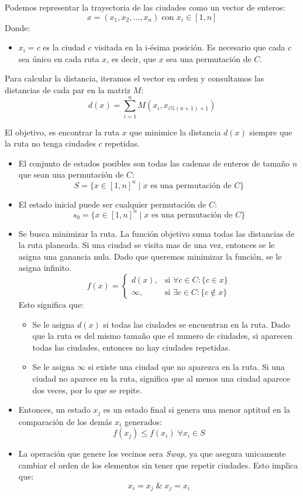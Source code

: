 Podemos representar la trayectoria de las ciudades como un vector de enteros:
\[ x = (x_1, x_2, \dots, x_n) \; \text{con } x_i \in [1, n] \]
Donde:
\begin{itemize}
	\item $x_i = c$ es la ciudad $c$ visitada en la i-ésima posición. Es necesario que cada $c$ sea único en cada ruta $x$, es decir, que $x$ sea una permutación de $C$.
\end{itemize}

Para calcular la distancia, iteramos el vector en orden y consultamos las distancias de cada par en la matriz $M$: 
\[ d(x) = \sum_{i = 1}^{n} M(x_i, x_{i \%(n+1)+ 1}) \]

El objetivo, es encontrar la ruta $x$ que minimice la distancia $d(x)$ siempre que la ruta no tenga ciudades $c$ repetidas.

\begin{itemize}
	\item El conjunto de estados posibles son todas las cadenas de enteros de tamaño $n$ que sean una permutación de $C$: \[ S = \{ x \in [1, n]^n \;|\; x \text{ es una permutación de } C \} \]
	
	\item El estado inicial puede ser cualquier permutación de $C$: 
	\[ s_0 = \{ x \in [1, n]^n \;|\; x \text{ es una permutación de } C \} \]
	
	\item Se busca minimizar la ruta. La función objetivo suma todas las distancias de la ruta planeada. Si una ciudad se visita mas de una vez, entonces se le asigna una ganancia nula. Dado que queremos minimizar la función, se le asigna infinito.
	\[
	f(x) =
	\begin{cases} 
		d(x), & \text{si } \forall c \in C \colon \{ c \in x \} \\ 
		\infty, & \text{si } \exists c \in C \colon \{c \notin x\}
	\end{cases}
	\]
	Esto significa que:
	\begin{itemize}
		\item Se le asigna $d(x)$ si todas las ciudades se encuentran en la ruta. Dado que la ruta es del mismo tamaño que el numero de ciudades, si aparecen todas las ciudades, entonces no hay ciudades repetidas.
		\item Se le asigna $\infty$ si existe una ciudad que no aparezca en la ruta. Si una ciudad no aparece en la ruta, significa que al menos una ciudad aparece dos veces, por lo que se repite.
	\end{itemize}
	
	\item Entonces, un estado $x_j$ es un estado final si genera una menor aptitud en la comparación de los demás $x_i$ generados: \[ f(x_j) \leq f(x_i) \; \forall x_i \in S \]
	
	\item La operación que genere los vecinos sera \textit{Swap}, ya que asegura unicamente cambiar el orden de los elementos sin tener que repetir ciudades. Esto implica que: \[ x_i = x_j \; \&  \; x_j = x_i \]
	
\end{itemize}



